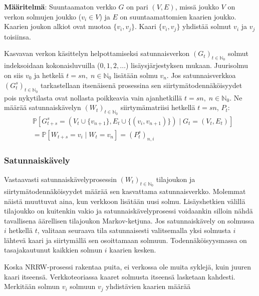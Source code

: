 \documentclass[finnish, 12pt, a4paper, sci, utf8, pdfa]{aaltothesis}
\newcommand{\N}{\mathbb{N}}
\newcommand*{\prob}{\mathbb{P}}
\begin{document}
\textbf{Määritelmä}: Suuntaamaton verkko $ G $ on pari $ (V, E) $, missä joukko $ V $ on verkon solmujen joukko (\( v_{i} \in V \)) ja $ E $ on suuntaamattomien kaarien joukko. Kaarien joukon alkiot ovat muotoa \( \{ v_{i}, v_{j} \} \). Kaari \( \{ v_{i}, v_{j} \} \) yhdistää solmut \( v_{i} \) ja \( v_{j} \) toisiinsa. 

\vspace{0.5cm}

Kasvavan verkon käsittelyn helpottamiseksi satunnaisverkon \( (G_{t})_{t \in \N_{0}} \) solmut indeksoidaan kokonaisluvuilla (\( 0, 1, 2, \ldots \)) lisäysjärjestyksen mukaan. Juurisolmu on siis \( v_{0} \) ja hetkelä \( t = sn, \; n \in \N_{0} \) lisätään solmu \( v_{n} \). Jos satunnaisverkkoa \( (G_{t}^{s})_{t \in \N_{0}} \) tarkastellaan itsenäisenä prosessina sen siirtymätodennäköisyydet pois nykytilasta ovat nollasta poikkeavia vain ajanhetkillä \( t = sn, \; n \in \N_{0} \). Ne määrää satunnaiskävelyn \( (W_{t})_{t \in \N_{0}} \) siirtymämatriisi hetkellä \( t = sn \), \( P_{t} \):
\begin{equation}
\begin{split}
   & \prob \left[ G_{t+s}^{s} = (V_{t} \cup \{ v_{n + 1} \}, E_{t} \cup \{ (v_{i}, v_{n + 1}) \}) \mid G_{t} = (V_{t}, E_{t}) \right] \\
   &= \prob \left[ W_{t+s} = v_{i} \mid W_{t} = v_{n} \right] = (P_{t}^{s})_{n,i}
\end{split}
\end{equation}

\subsubsection{Satunnaiskävely}

Vastaavasti satunnaiskävelyprosessin \( (W_{t})_{t \in \N_{0}} \) tilajoukon ja siirtymätodennäköisyydet määrää sen kasvattama satunnaisverkko. Molemmat näistä muuttuvat aina, kun verkkoon lisätään uusi solmu. Lisäyshetkien välillä tilajoukko on kuitenkin vakio ja satunnaiskävelyprosessi voidaankin silloin nähdä tavallisena äärellisen tilajoukon Markov-ketjuna. Jos satunnaiskävely on solmussa \( i \) hetkellä \( t \), valitaan seuraava tila satunnaisesti valitsemalla yksi solmusta \( i \) lähtevä kaari ja siirtymällä sen osoittamaan solmuun. Todennäköisyysmassa on tasajakautunut kaikkien solmun \( i \) kaarien kesken. 

Koska NRRW-prosessi rakentaa puita, ei verkossa ole muita syklejä, kuin juuren kaari itseensä. Verkkoteoriassa kaaret solmusta itseensä lasketaan kahdesti. Merkitään solmun \( v_{i} \) solmuun \( v_{j} \) yhdistävien kaarien määrää
\end{document}
